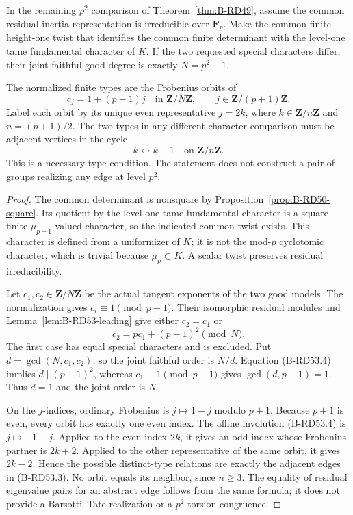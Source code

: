 \begin{proposition}
\label{prop:B-RD53-cycle}
In the remaining $p^2$ comparison of Theorem~\ref{thm:B-RD49},
assume the common residual inertia representation is irreducible
over $\mathbf F_p$. Make the common finite height-one twist
that identifies the common finite determinant with the
level-one tame fundamental character of $K$.
If the two requested special characters differ, their joint
faithful good degree is exactly $N=p^2-1$.

The normalized finite types are the Frobenius orbits of
\[
 c_j=1+(p-1)j\quad\text{in }\mathbf Z/N\mathbf Z,
            \qquad j\in\mathbf Z/(p+1)\mathbf Z.
\]
Label each orbit by its unique even representative $j=2k$,
where $k\in\mathbf Z/n\mathbf Z$ and $n=(p+1)/2$.
The two types in any different-character comparison must
be adjacent vertices in the cycle
\[
                    k\longleftrightarrow k+1
                 \quad\text{on }\mathbf Z/n\mathbf Z. \tag{B-RD53.3}
\]
This is a necessary type condition. The statement does not
construct a pair of groups realizing any edge at level $p^2$.
\end{proposition}
\begin{proof}
The common determinant is nonsquare by
Proposition~\ref{prop:B-RD50-square}. Its quotient by the
level-one tame fundamental character is a square finite
$\mu_{p-1}$-valued character, so the indicated common twist
exists. This character is defined from a uniformizer of $K$;
it is not the mod-$p$ cyclotomic character, which is trivial
because $\mu_p\subset K$. A scalar twist preserves residual
irreducibility.

Let $c_1,c_2\in\mathbf Z/N\mathbf Z$ be the actual tangent
exponents of the two good models. The normalization gives
$c_i\equiv1\pmod{p-1}$. Their isomorphic residual modules
and Lemma~\ref{lem:B-RD53-leading} give either $c_2=c_1$ or
\[
                     c_2=pc_1+(p-1)^2\pmod N.          \tag{B-RD53.4}
\]
The first case has equal special characters and is excluded.
Put $d=\gcd(N,c_1,c_2)$, so the joint faithful order is $N/d$.
Equation (B-RD53.4) implies $d\mid(p-1)^2$, whereas
$c_1\equiv1\pmod{p-1}$ gives $\gcd(d,p-1)=1$.
Thus $d=1$ and the joint order is $N$.

On the $j$-indices, ordinary Frobenius is
$j\mapsto1-j$ modulo $p+1$. Because $p+1$ is even, every
orbit has exactly one even index. The affine involution
(B-RD53.4) is $j\mapsto-1-j$. Applied to the even index
$2k$, it gives an odd index whose Frobenius partner is
$2k+2$. Applied to the other representative of the same
orbit, it gives $2k-2$. Hence the possible distinct-type
relations are exactly the adjacent edges in (B-RD53.3).
No orbit equals its neighbor, since $n\ge3$.
The equality of residual eigenvalue pairs for an abstract
edge follows from the same formula; it does not provide a
Barsotti--Tate realization or a $p^2$-torsion congruence.
\end{proof}

